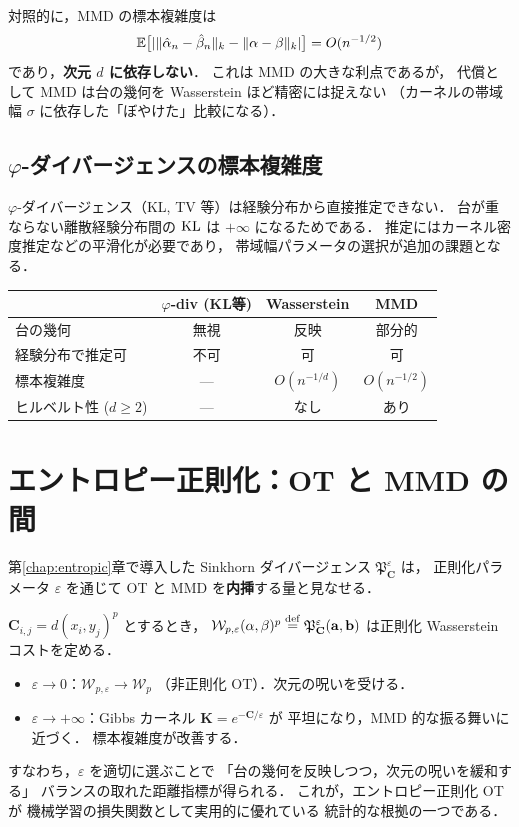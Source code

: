 対照的に，MMD の標本複雑度は
\begin{equation}\label{eq:mmd-rate}
  \mathbb{E}\bigl[|\|\hat{\alpha}_n - \hat{\beta}_n\|_k
  - \|\alpha - \beta\|_k|\bigr]
  = O(n^{-1/2})
\end{equation}
であり，\textbf{次元 $d$ に依存しない}．
これは MMD の大きな利点であるが，
代償として MMD は台の幾何を Wasserstein ほど精密には捉えない
（カーネルの帯域幅 $\sigma$ に依存した「ぼやけた」比較になる）．

\subsection{$\varphi$-ダイバージェンスの標本複雑度}\label{subsec:phi-rate}

$\varphi$-ダイバージェンス（KL, TV 等）は経験分布から直接推定できない．
台が重ならない離散経験分布間の $\operatorname{KL}$ は $+\infty$ になるためである．
推定にはカーネル密度推定などの平滑化が必要であり，
帯域幅パラメータの選択が追加の課題となる．

\medskip
\begin{center}
\begin{tabular}{lccc}
  & $\varphi$-div (KL等) & Wasserstein & MMD \\
  \hline
  台の幾何 & 無視 & 反映 & 部分的 \\
  経験分布で推定可 & 不可 & 可 & 可 \\
  標本複雑度 & --- & $O(n^{-1/d})$ & $O(n^{-1/2})$ \\
  ヒルベルト性 ($d \geq 2$) & --- & なし & あり \\
  \hline
\end{tabular}
\end{center}

\section{エントロピー正則化：OT と MMD の間}\label{sec:ot-mmd}

第\ref{chap:entropic}章で導入した Sinkhorn ダイバージェンス
$\mathfrak{P}^\varepsilon_{\mathbf{C}}$ は，
正則化パラメータ $\varepsilon$ を通じて
OT と MMD を\textbf{内挿}する量と見なせる．

$\mathbf{C}_{i,j} = d(x_i, y_j)^p$ とするとき，
$\mathcal{W}_{p,\varepsilon}(\alpha, \beta)^p
\overset{\mathrm{def}}{=} \mathfrak{P}^\varepsilon_{\mathbf{C}}(\mathbf{a}, \mathbf{b})$
は正則化 Wasserstein コストを定める．

\begin{itemize}
  \item $\varepsilon \to 0$：$\mathcal{W}_{p,\varepsilon} \to \mathcal{W}_p$
    （非正則化 OT）．次元の呪いを受ける．
  \item $\varepsilon \to +\infty$：Gibbs カーネル
    $\mathbf{K} = e^{-\mathbf{C}/\varepsilon}$ が
    平坦になり，MMD 的な振る舞いに近づく．
    標本複雑度が改善する．
\end{itemize}

すなわち，$\varepsilon$ を適切に選ぶことで
「台の幾何を反映しつつ，次元の呪いを緩和する」
バランスの取れた距離指標が得られる．
これが，エントロピー正則化 OT が
機械学習の損失関数として実用的に優れている
統計的な根拠の一つである．
